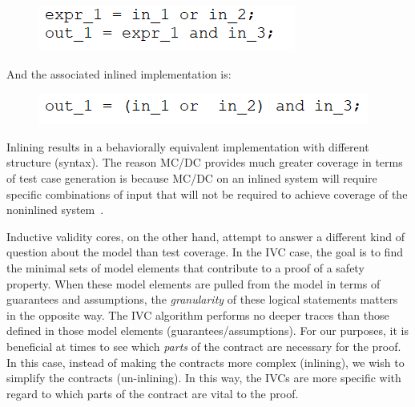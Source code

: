 \begin{figure}[h]
	\begin{center}
		\includegraphics[scale=1.0]{images/uninlinedEx.PNG}
	\end{center}
	\vspace{-1.5em}
\end{figure}

And the associated inlined implementation is: 

\begin{figure}[h]
	\begin{center}
		\includegraphics[scale=1.0]{images/inlined.PNG}
	\end{center}
	\vspace{-1.5em}
\end{figure}

Inlining results in a behaviorally equivalent implementation with different structure (syntax). The reason MC/DC provides much greater coverage in terms of test case generation is because MC/DC on an inlined system will require specific combinations of input that will not be required to achieve coverage of the noninlined system~\cite{gay2016effect}. 

Inductive validity cores, on the other hand, attempt to answer a different kind of question about the model than test coverage. In the IVC case, the goal is to find the minimal sets of model elements that contribute to a proof of a safety property. When these model elements are pulled from the model in terms of guarantees and assumptions, the \emph{granularity} of these logical statements matters in the opposite way. The IVC algorithm performs no deeper traces than those defined in those model elements (guarantees/assumptions). For our purposes, it is beneficial at times to see which \emph{parts} of the contract are necessary for the proof. In this case, instead of making the contracts more complex (inlining), we wish to simplify the contracts (un-inlining). In this way, the IVCs are more specific with regard to which parts of the contract are vital to the proof.


